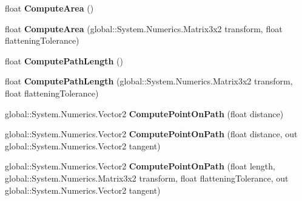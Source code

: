 \begin{DoxyCompactItemize}
float {\bfseries Compute\+Area} ()
\item 
\mbox{\label{interface_microsoft_1_1_graphics_1_1_canvas_1_1_geometry_1_1_i_canvas_geometry_abccc0c3b05f197af6abf2a494662b435}} 
float {\bfseries Compute\+Area} (global\+::\+System.\+Numerics.\+Matrix3x2 transform, float flattening\+Tolerance)
\item 
\mbox{\label{interface_microsoft_1_1_graphics_1_1_canvas_1_1_geometry_1_1_i_canvas_geometry_a7b9a9d62779c0ffb9edae6b37d603e83}} 
float {\bfseries Compute\+Path\+Length} ()
\item 
\mbox{\label{interface_microsoft_1_1_graphics_1_1_canvas_1_1_geometry_1_1_i_canvas_geometry_a86d3efebb758fbccdb757cae6bd3be83}} 
float {\bfseries Compute\+Path\+Length} (global\+::\+System.\+Numerics.\+Matrix3x2 transform, float flattening\+Tolerance)
\item 
\mbox{\label{interface_microsoft_1_1_graphics_1_1_canvas_1_1_geometry_1_1_i_canvas_geometry_a8d6d3c32929175715f13de9f723e337c}} 
global\+::\+System.\+Numerics.\+Vector2 {\bfseries Compute\+Point\+On\+Path} (float distance)
\item 
\mbox{\label{interface_microsoft_1_1_graphics_1_1_canvas_1_1_geometry_1_1_i_canvas_geometry_a294f3ceb3a3cc6a0a96a5a902d21cb7a}} 
global\+::\+System.\+Numerics.\+Vector2 {\bfseries Compute\+Point\+On\+Path} (float distance, out global\+::\+System.\+Numerics.\+Vector2 tangent)
\item 
\mbox{\label{interface_microsoft_1_1_graphics_1_1_canvas_1_1_geometry_1_1_i_canvas_geometry_ad81c3e0d8ae57428fe171ea8ae3cf362}} 
global\+::\+System.\+Numerics.\+Vector2 {\bfseries Compute\+Point\+On\+Path} (float length, global\+::\+System.\+Numerics.\+Matrix3x2 transform, float flattening\+Tolerance, out global\+::\+System.\+Numerics.\+Vector2 tangent)
\item 

\end{DoxyCompactItemize}
